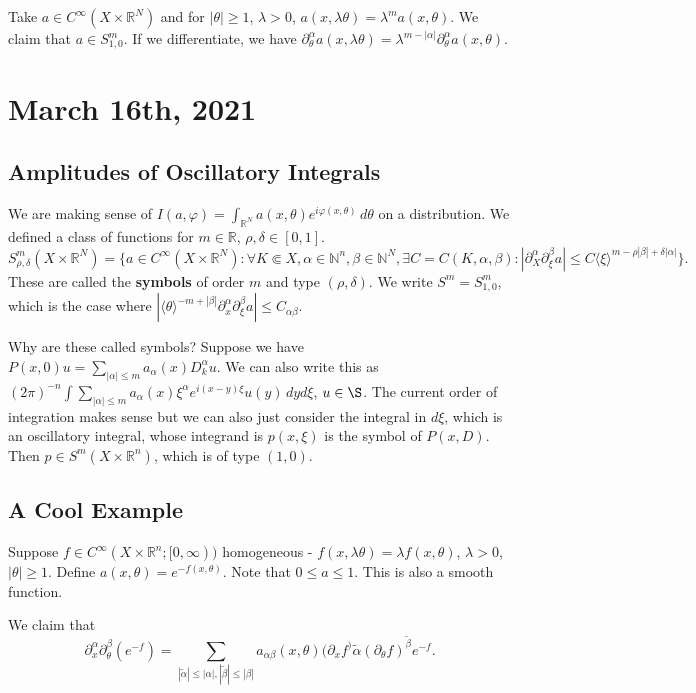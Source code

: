 \documentclass[12pt]{scrartcl}
\newcommand{\N}{\mathbb{N}}
\newcommand{\R}{\mathbb{R}}
\newcommand{\<}{\langle}
\renewcommand{\>}{\rangle}
\let \phi \varphi
\begin{document}
\begin{example} Take $a \in C^\infty(X \times \R^N)$ and for $|\theta| \ge 1$, $\lambda > 0$, $a(x, \lambda \theta) = \lambda^m a(x, \theta)$.  We claim that $a \in S_{1, 0}^m$.  If we differentiate, we have $\partial_\theta^\alpha a(x, \lambda \theta) = \lambda^{m - |\alpha|} \partial_\theta^\alpha a(x, \theta)$.
\end{example}
\pagebreak
\section{March 16th, 2021}
\subsection{Amplitudes of Oscillatory Integrals}
We are making sense of $I(a, \phi) = \int_{\R^N} a(x, \theta) e^{i\phi(x, \theta)}\,d\theta$ on a distribution.  We defined a class of functions for $m \in \R$, $\rho, \delta \in [0, 1]$.  $S_{\rho, \delta}^m(X \times \R^{N}) = \{a \in C^\infty(X \times \R^N) : \forall K \Subset X, \alpha \in \N^n, \beta \in \N^N, \exists C = C(K, \alpha, \beta) : |\partial_X^\alpha \partial_{\xi}^\beta a| \le C\<\xi\>^{m - \rho|\beta| + \delta|\alpha|}\}.$ These are called the \textbf{symbols} of order $m$ and type $(\rho, \delta)$.  We write $S^m = S_{1, 0}^m$, which is the case where $|\<\theta\>^{-m+|\beta|}\partial_x^\alpha \partial_\xi^\beta a | \le C_{\alpha \beta}$.

Why are these called symbols?  Suppose we have $P(x, 0)u = \sum_{|\alpha| \le  m} a_\alpha(x) D_k^\alpha u$.  We can also write this as $(2\pi)^{-n} \int \sum_{|\alpha| \le m} a_\alpha(x) \xi^\alpha e^{i(x - y)\xi} u(y)\,dy d\xi$, $u \in \S$.  The current order of integration makes sense but we can also just consider the integral in $d\xi$, which is an oscillatory integral, whose integrand is $p(x, \xi)$ is the symbol of $P(x, D)$.  Then $p \in S^m(X \times \R^n)$, which is of type $(1, 0)$.  

\subsection{A Cool Example}


Suppose $f \in C^\infty(X \times \R^n; [0, \infty))$ homogeneous - $f(x, \lambda \theta) = \lambda  f(x, \theta)$, $\lambda > 0$, $|\theta| \ge 1$.  Define $a(x, \theta) = e^{-f(x, \theta)}$.  Note that $0 \le a \le 1$.  This is also a smooth function.  

We claim that $$\partial_x^\alpha \partial_\theta^\beta (e^{-f}) = \sum_{|\tilde{\alpha}| \le |\alpha|, |\tilde{\beta}| \le |\beta|} a_{\alpha \beta}(x, \theta) (\partial_x f^){\tilde{\alpha}} (\partial_\theta f)^{\tilde{\beta}}  e^{-f}.$$
\end{document}

